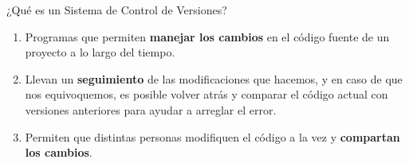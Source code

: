 \begin{frame}{¿Qué es un Sistema de Control de Versiones?}

	\begin{block}{}
 \begin{enumerate}
     \item Programas que permiten \textbf{manejar los cambios} en el código fuente de un proyecto a lo largo del tiempo.
     \item Llevan un \textbf{seguimiento} de las modificaciones que hacemos, y en caso de que nos equivoquemos, es posible volver atrás y comparar el código actual con versiones anteriores para ayudar a arreglar el error.
     \item Permiten que distintas personas modifiquen el código a la vez y \textbf{compartan los cambios}.
 \end{enumerate}

	\end{block}


\end{frame}

